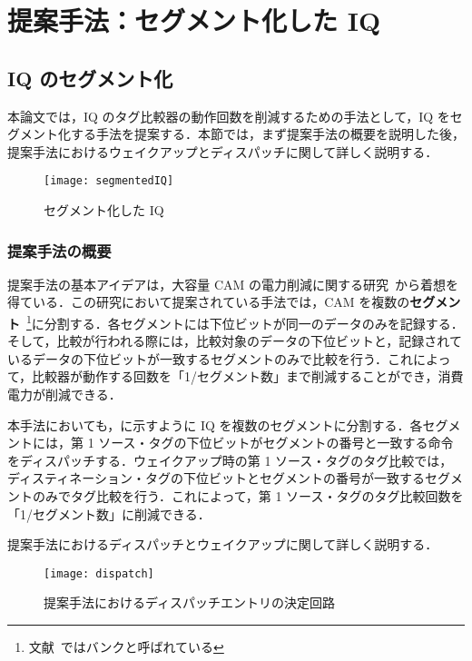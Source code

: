 
\chapter{提案手法：セグメント化した IQ}
\label{sec:segment_IQ}

\section{IQ のセグメント化}
\label{sec:segmented_IQ}
本論文では，IQ のタグ比較器の動作回数を削減するための手法として，IQ をセグメント化する手法を提案する．本節では，まず提案手法の概要を説明した後，提案手法におけるウェイクアップとディスパッチに関して詳しく説明する．

\begin{figure}[htb]
  \centering
  \texttt{[image: segmentedIQ]}
  \caption{セグメント化した IQ}
  \label{fig:segmentedIQ}
\end{figure}

\subsection{提案手法の概要}
提案手法の基本アイデアは，大容量 CAM の電力削減に関する研究~\cite{Motomura1990paper,Motomura1990journal}から着想を得ている．この研究において提案されている手法では，CAM を複数の\textbf{セグメント}~\footnote{文献~\cite{Motomura1990paper,Motomura1990journal}ではバンクと呼ばれている}に分割する．各セグメントには下位ビットが同一のデータのみを記録する．そして，比較が行われる際には，比較対象のデータの下位ビットと，記録されているデータの下位ビットが一致するセグメントのみで比較を行う．これによって，比較器が動作する回数を「1/セグメント数」まで削減することができ，消費電力が削減できる．

本手法においても，に示すように IQ を複数のセグメントに分割する．各セグメントには，第 1 ソース・タグの下位ビットがセグメントの番号と一致する命令をディスパッチする．ウェイクアップ時の第 1 ソース・タグのタグ比較では，ディスティネーション・タグの下位ビットとセグメントの番号が一致するセグメントのみでタグ比較を行う．これによって，第 1 ソース・タグのタグ比較回数を「1/セグメント数」に削減できる．

提案手法におけるディスパッチとウェイクアップに関して詳しく説明する．

\begin{figure}[tb]
  \centering
  \texttt{[image: dispatch]}
  \caption{提案手法におけるディスパッチエントリの決定回路}
  \label{fig:dispatch}
\end{figure}


